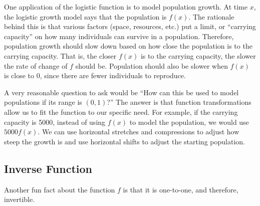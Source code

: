 \documentclass{ximera}
\begin{document}
One application of the logistic function is to model population growth. At time $x$, the logistic growth model says that the population is $f(x)$. The rationale behind this is that various factors (space, resources, etc.) put a limit, or ``carrying capacity'' on how many individuals can survive in a population. Therefore, population growth should slow down based on how close the population is to the carrying capacity. That is, the closer $f(x)$ is to the carrying capacity, the slower the rate of change of $f$ should be. Population should also be slower when $f(x)$ is close to 0, since there are fewer individuals to reproduce. 

A very reasonable question to ask would be ``How can this be used to model populations if its range is $(0, 1)$?'' The answer is that function transformations allow us to fit the function to our specific need. For example, if the carrying capacity is 5000, instead of using $f(x)$ to model the population, we would use $5000f(x)$. We can use horizontal stretches and compressions to adjust how steep the growth is and use horizontal shifts to adjust the starting population. 

\subsection{Inverse Function}
Another fun fact about the function $f$ is that it is one-to-one, and therefore, invertible. 
\end{document}
